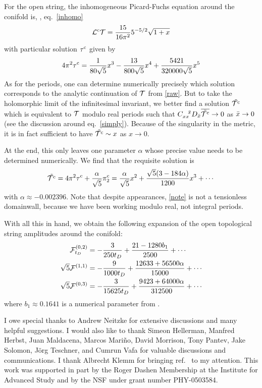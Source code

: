 For the open string, the inhomogeneous Picard-Fuchs equation around
the conifold is, \cf, eq.\ \eqref{inhomo}
\begin{equation}
{\cal L}^{\rm c}{\cal T} = \frac{15}{16\pi^2} 5^{-5/2} \sqrt{1+x}
\end{equation}
with particular solution $\tau^{\rm c}$ given by
\begin{equation}
4\pi^2 \tau^{\rm c} = \frac{1}{80\sqrt{5}}x^3 - \frac{13}{800\sqrt{5}}x^4
+\frac{5421}{320000\sqrt{5}} x^5
\end{equation}
As for the periods, one can determine numerically precisely which 
solution corresponds to the analytic continuation of ${\cal T}$ from 
\eqref{raw}. But to take the holomorphic limit of the infinitesimal 
invariant, we better find a solution $\tilde{{\cal T}^{\rm c}}$ which is equivalent 
to ${\cal T}$ modulo real periods such that $C_{xx}^{\;\;\;{\bar x}} 
D_{\bar x}\overline{\tilde{{\cal T}^{\rm c}}}\to 0$ as ${\bar x}\to 0$ (see the discussion 
around eq.\ \eqref{simply}). Because of the singularity in the metric, 
it is in fact sufficient to have $\tilde{{\cal T}^{\rm c}} \sim x$ as $x\to 0$. 

At the end, this only leaves one parameter $\alpha$ whose
precise value needs to be determined numerically. We find that the 
requisite solution is
\begin{equation}
\eqlabel{note}
\tilde\caltc = 4\pi^2\tauc + \frac{\alpha}{\sqrt{5}} \pic_2
=\frac{\alpha}{\sqrt{5}} x^2 + \frac{\sqrt{5}(3-184\alpha)}{1200} x^3 
+ \cdots
\end{equation}
with $\alpha\approx -0.002396$. Note that despite appearances, \eqref{note} 
is not a tensionless domainwall, because we have been working modulo real, 
not integral periods.

With all this in hand, we obtain the following expansion of the 
open topological string amplitudes around the conifold:
\begin{equation}
\begin{split}
{{\cal F}}^{(0,2)}_{t_D} &= -\frac{3}{250 t_D} + \frac{21-1280 b_1}{2500} + \cdots \\
\sqrt{5} {{\cal F}}^{(1,1)} &= -\frac{9}{1000 t_D} + \frac{12633+56500\alpha}{15000} +\cdots\\
\sqrt{5} {{\cal F}}^{(0,3)} &= -\frac{3}{15625 t_D} + \frac{9423+64000\alpha}{312500}+\cdots
\end{split}
\end{equation}
where $b_1 \approx 0.1641$ is a numerical parameter from \cite{hkq}.


\begin{acknowledgments}
I owe special thanks to Andrew Neitzke for extensive discussions and many
helpful suggestions. I would also like to thank Simeon Hellerman, Manfred 
Herbst, Juan Maldacena, Marcos Mari\~no, David Morrison, Tony Pantev, Jake 
Solomon, J\"org Teschner, and Cumrun Vafa for valuable discussions and 
communications. I thank Albrecht Klemm for bringing ref.\ \cite{schumacher} 
to my attention. This work was supported in part by the Roger Dashen Membership 
at the Institute for Advanced Study and by the NSF under grant number 
PHY-0503584.
\end{acknowledgments}








